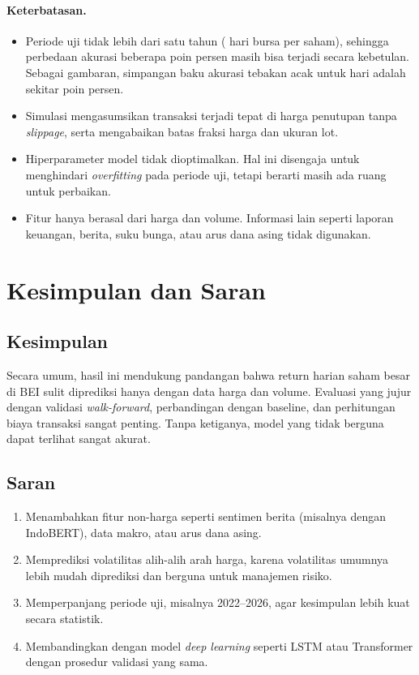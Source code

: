 \documentclass[11pt,a4paper]{article}
\begin{document}
\paragraph{Keterbatasan.}
\begin{itemize}
  \item Periode uji tidak lebih dari satu tahun (\JumlahHariUji{} hari bursa per saham),
        sehingga perbedaan akurasi beberapa poin persen masih bisa terjadi secara kebetulan.
        Sebagai gambaran, simpangan baku akurasi tebakan acak untuk \JumlahHariUji{} hari
        adalah sekitar \SimpanganAcak{} poin persen.
  \item Simulasi mengasumsikan transaksi terjadi tepat di harga penutupan tanpa
        \emph{slippage}, serta mengabaikan batas fraksi harga dan ukuran lot.
  \item Hiperparameter model tidak dioptimalkan. Hal ini disengaja untuk menghindari
        \emph{overfitting} pada periode uji, tetapi berarti masih ada ruang untuk perbaikan.
  \item Fitur hanya berasal dari harga dan volume. Informasi lain seperti laporan keuangan,
        berita, suku bunga, atau arus dana asing tidak digunakan.
\end{itemize}

\section{Kesimpulan dan Saran}

\subsection{Kesimpulan}


Secara umum, hasil ini mendukung pandangan bahwa return harian saham besar di BEI sulit
diprediksi hanya dengan data harga dan volume. Evaluasi yang jujur dengan validasi
\emph{walk-forward}, perbandingan dengan baseline, dan perhitungan biaya transaksi sangat
penting. Tanpa ketiganya, model yang tidak berguna dapat terlihat sangat akurat.

\subsection{Saran}
\begin{enumerate}
  \item Menambahkan fitur non-harga seperti sentimen berita (misalnya dengan IndoBERT),
        data makro, atau arus dana asing.
  \item Memprediksi volatilitas alih-alih arah harga, karena volatilitas umumnya lebih mudah
        diprediksi dan berguna untuk manajemen risiko.
  \item Memperpanjang periode uji, misalnya 2022--2026, agar kesimpulan lebih kuat secara
        statistik.
  \item Membandingkan dengan model \emph{deep learning} seperti LSTM atau Transformer
        dengan prosedur validasi yang sama.
\end{enumerate}
\end{document}
